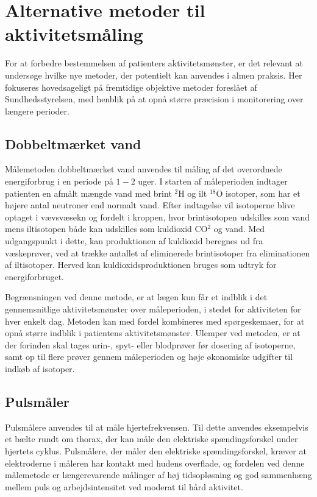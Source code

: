 \section{Alternative metoder til aktivitetsmåling}

For at forbedre bestemmelsen af patienters aktivitetsmønster, er det relevant at undersøge hvilke nye metoder, der potentielt kan anvendes i almen praksis. Her fokuseres hovedsageligt på fremtidige objektive metoder foreslået af Sundhedsstyrelsen, med henblik på at opnå større præcision i monitorering over længere perioder.

\subsection{Dobbeltmærket vand}

Målemetoden dobbeltmærket vand anvendes til måling af det overordnede energiforbrug i en periode på $1-2$ uger. I starten af måleperioden indtager patienten en afmålt mængde vand med brint  $^2$H og ilt $^18$O isotoper, som har et højere antal neutroner end normalt vand. Efter indtagelse vil isotoperne blive optaget i vævsvæsekn og fordelt i kroppen, hvor brintisotopen udskilles som vand mens iltisotopen både kan udskilles som kuldioxid CO$^2$ og vand. Med udgangspunkt i dette, kan produktionen af kuldioxid beregnes ud fra væskeprøver, ved at trække antallet af eliminerede brintisotoper fra eliminationen af iltisotoper. Herved kan kuldioxidsproduktionen bruges som udtryk for energiforbruget\citep{pedersen2011, motionsraad2007}.

Begrænsningen ved denne metode, er at lægen kun får et indblik i det gennemsnitlige aktivitetsmønster over måleperioden, i stedet for aktiviteten for hver enkelt dag. Metoden kan med fordel kombineres med spørgeskemaer, for at opnå større indblik i patientens aktivitetsmønster. Ulemper ved metoden, er at der forinden skal tages urin-, spyt- eller blodprøver før dosering af isotoperne, samt op til flere prøver gennem måleperioden og høje økonomiske udgifter til indkøb af isotoper\citep{motionsraad2007}.

\subsection{Pulsmåler}

Pulsmålere anvendes til at måle hjertefrekvensen. Til dette anvendes eksempelvis et bælte rundt om thorax, der kan måle den elektriske spændingsforskel under hjertets cyklus. Pulsmålere, der måler den elektriske spændingsforskel, kræver at elektroderne i måleren har kontakt med hudens overflade, og fordelen ved denne målemetode er længerevarende målinger af høj tidsopløsning og god sammenhæng mellem puls og arbejdsintensitet ved moderat til hård aktivitet\citep{motionsraad2007}. 

